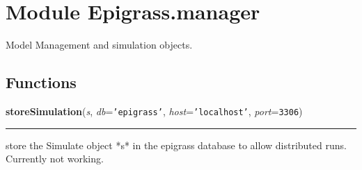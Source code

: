 %
%
%


\section{Module Epigrass.manager}

    \label{Epigrass:manager}
Model Management and simulation objects.



  \subsection{Functions}

    \label{Epigrass:manager:storeSimulation}

    \vspace{0.5ex}

    \begin{boxedminipage}{\textwidth}

    \raggedright \textbf{storeSimulation}(\textit{s}, \textit{db}=\texttt{'epigrass'}, \textit{host}=\texttt{'localhost'}, \textit{port}=\texttt{3306})

    \vspace{-1.5ex}

    \rule{\textwidth}{0.5\fboxrule}
    store the Simulate object *s* in the epigrass database to allow 
    distributed runs. Currently not working.

    \vspace{1ex}

    \end{boxedminipage}



